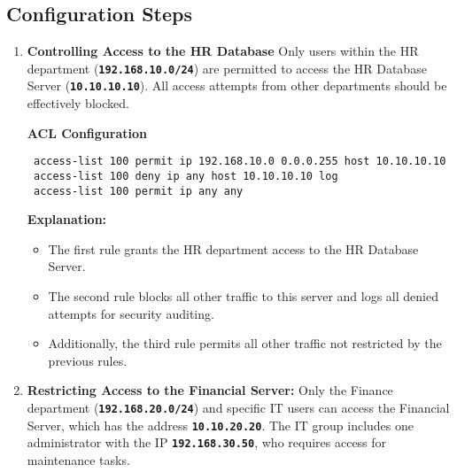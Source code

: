 \documentclass[11pt,a4paper]{article}
\begin{document}
        \subsection*{Configuration Steps}
            \begin{enumerate}
                \item \textbf{Controlling Access to the HR Database}
                \newline
                Only users within the HR department (\textbf{\lstinline{192.168.10.0/24}}) are permitted to access the HR Database Server (\textbf{\lstinline{10.10.10.10}}). All access attempts from other departments should be effectively blocked.

                \textbf{ACL Configuration}
\begin{lstlisting}
 access-list 100 permit ip 192.168.10.0 0.0.0.255 host 10.10.10.10
 access-list 100 deny ip any host 10.10.10.10 log
 access-list 100 permit ip any any
\end{lstlisting}

                    \textbf{Explanation:}
                        \begin{itemize}
                            \item The first rule grants the HR department access to the HR Database Server.
                            \item The second rule blocks all other traffic to this server and logs all denied attempts for security auditing.
                            \item Additionally, the third rule permits all other traffic not restricted by the previous rules.
                        \end{itemize}

                \item \textbf{Restricting Access to the Financial Server:}
                \newline
                Only the Finance department (\textbf{\lstinline{192.168.20.0/24}}) and specific IT users can access the Financial Server, which has the address \textbf{\lstinline{10.10.20.20}}. The IT group includes one administrator with the IP \textbf{\lstinline{192.168.30.50}}, who requires access for maintenance tasks.


\end{enumerate}
\end{document}
